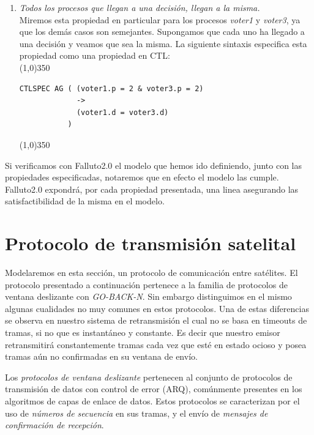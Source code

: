 \documentclass[pdftex,a4paper,12pt]{book}
\begin{document}
\begin{enumerate}
\item \textit{Todos los procesos que llegan a una decisi\'on, llegan a la misma.}\\ Miremos esta propiedad en particular para los procesos \textit{voter1} y \textit{voter3}, ya que los dem\'as casos son semejantes. Supongamos que cada uno ha llegado a una decisi\'on y veamos que sea la misma. La siguiente sintaxis especifica esta propiedad como una propiedad en CTL:\\
\noindent \line(1,0){350}
\begin{verbatim}
CTLSPEC AG ( (voter1.p = 2 & voter3.p = 2) 
             -> 
             (voter1.d = voter3.d)
           )
\end{verbatim}
\noindent \line(1,0){350}

\end{enumerate}

Si verificamos con Falluto2.0 el modelo que hemos ido definiendo, junto con las propiedades especificadas, notaremos que en efecto el modelo las cumple. Falluto2.0 expondr\'a, por cada propiedad presentada, una linea asegurando las satisfactibilidad de la misma en el modelo.






\section{Protocolo de transmisi\'on satelital}

Modelaremos en esta secci\'on, un protocolo de comunicaci\'on entre sat\'elites. El protocolo presentado a continuaci\'on pertenece a la familia de protocolos de ventana deslizante con \textit{GO-BACK-N}. Sin embargo distinguimos en el mismo algunas cualidades no muy comunes en estos protocolos. Una de estas diferencias se observa en nuestro sistema de retransmisi\'on el cual no se basa en timeouts de tramas, si no que es instant\'aneo y constante. Es decir que nuestro emisor retransmitir\'a constantemente tramas cada vez que est\'e en estado ocioso y posea tramas a\'un no confirmadas en su ventana de env\'io.

Los \textit{protocolos de ventana deslizante} pertenecen al conjunto de protocolos de transmisi\'on de datos con control de error (ARQ), com\'unmente presentes en los algoritmos de capas de enlace de datos. Estos protocolos se caracterizan por el uso de \textit{n\'umeros de secuencia} en sus tramas, y el env\'io de \textit{mensajes de confirmaci\'on de recepci\'on}.
\end{document}

